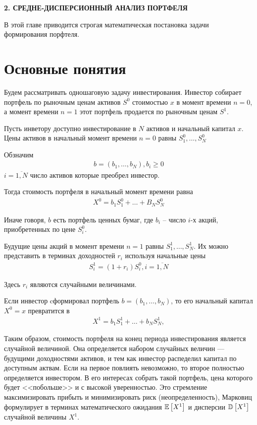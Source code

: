 \newpage
\begin{center}
	\textbf{\large 2. СРЕДНЕ-ДИСПЕРСИОННЫЙ АНАЛИЗ ПОРТФЕЛЯ}
\end{center}

В этой главе приводится строгая математическая постановка задачи формирования
порфтеля.

\section{Основные понятия}

Будем рассматривать одношаговую задачу инвестирования. Инвестор собирает портфель по рыночным ценам активов $S^0$
стоимостью $x$ в момент времени $n=0$, а момент времени $n=1$ этот портфель продается по рыночным ценам $S^1$.

Пусть инветору доступно инвестирование в $N$ активов и начальный капитал $x$. 
Цены активов в начальный момент времени $n=0$ равны
$S_1^0, \dots, S_N^0$

Обзначим 
\begin{align}
	b = (b_1, \dots, b_N), b_i \ge 0
\end{align}
$i=\overline{1, N}$ число активов которые преобрел инвестор.

Тогда стоимость портфеля в начальный момент времени равна
\begin{align}
	X^0 = b_1 S_1^0 + \dots + B_N S_N^0
\end{align}

Иначе говоря, $b$ есть портфель ценных бумаг, где $b_i$ -- число $i$-х акций, приобретенных по цене $S_i^0$.

Будущие цены акций в момент времени $n=1$ равны $S_1^1, \dots, S_N^1$. 
Их можно представить в терминах доходностей $r_i$ используя начальные цены
\begin{align}
	S_i^1 = (1 + r_i) S_i^0, i=\overline{1, N}
\end{align}

Здесь $r_i$ являются случайными величинами.


Если инвестор cформировал портфель $b = (b_1, \dots, b_N )$, то его начальный капитал $X^0 = x$ превратится в 
\begin{align}
	X^1 = b_1 S_1^1 + \dots + b_N S_N^1,
\end{align}

Таким образом, стоимость портфеля на конец периода инвестирования является случайной величиной. 
Она определяется набором случайных величин --- будущими доходностями активов, и тем как инвестор распеделил капитал
по доступным актвам. Если на первое повлиять невозможно, то второе полностью определяется инвестором.
В его интересах собрать такой портфель, цена которого будет <<побольше>> и с высокой уверенностью.
Это стремление максимизировать прибыть и минимизировать риск (неопределенность), Марковиц формулирует в терминах
математического ожидания $\mathbb{E}\left[X^1\right]$ и дисперсии $\mathbb{D}\left[X^1\right]$ случайной величины $X^1$.

